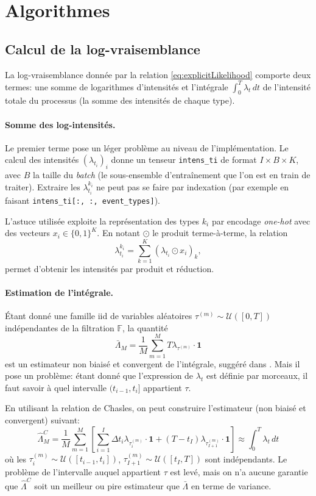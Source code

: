 \documentclass[../main.tex]{subfiles}
\begin{document}
\section{Algorithmes}\label{sec:algoAppendix}

\subsection{Calcul de la log-vraisemblance}

La log-vraisemblance donnée par la relation \eqref{eq:explicitLikelihood} comporte deux termes: une somme de logarithmes d'intensités et l'intégrale $\int_0^T\lambda_t\,dt$ de l'intensité totale du processus (la somme des intensités de chaque type).

\paragraph{Somme des log-intensités.} Le premier terme pose un léger problème au niveau de l'implémentation. Le calcul des intensités ${(\lambda_{t_i})}_i$ donne un tenseur \verb|intens_ti| de format $I\times B\times K$, avec $B$ la taille du \textit{batch} (le sous-ensemble d'entraînement que l'on est en train de traiter). Extraire les $\lambda^{k_i}_{t_i}$ ne peut pas se faire par indexation (par exemple en faisant \verb|intens_ti[:, :, event_types]|).

L'astuce utilisée exploite la représentation des types $k_i$ par encodage \textit{one-hot} avec des vecteurs $x_i\in{\{0,1\}}^K$. En notant $\odot$ le produit terme-à-terme, la relation
\[
\lambda^{k_i}_{t_i} = \sum_{k=1}^K {(\lambda_{t_i} \odot x_i)}_k,
\]
permet d'obtenir les intensités par produit et réduction.

\paragraph{Estimation de l'intégrale.} Étant donné une famille iid de variables aléatoires $\tau^{(m)}\sim\mathcal{U}([0,T])$ indépendantes de la filtration $\mathds{F}$, la quantité 
\[
\bar{\Lambda}_M = \frac{1}{M}\sum_{m=1}^{M}T\lambda_{\tau^{(m)}}\cdot\mathbf 1
\]
est un estimateur non biaisé et convergent de l'intégrale, suggéré dans \cite[16]{meiEisnerNeuralHawkes}. Mais il pose un problème: étant donné que l'expression de $\lambda_t$ est définie par morceaux, il faut savoir à quel intervalle $(t_{i-1}, t_i]$ appartient $\tau$.

En utilisant la relation de Chasles, on peut construire l'estimateur (non biaisé et convergent) suivant:
\begin{equation}
\hat{\Lambda}_M^C = \frac{1}{M}\sum_{m=1}^{M}\left[ \sum_{i=1}^{I} \Delta t_i\lambda_{\tau^{(m)}_i} \cdot \mathbf{1} + (T-t_{I})\lambda_{\tau^{(m)}_{I+1}}\cdot\mathbf{1}\right]
\approx
\int_0^T \lambda_t\,dt
\end{equation}
où les $\tau_i^{(m)}\sim\mathcal{U}([t_{i-1}, t_i])$, $\tau_{I+1}^{(m)}\sim\mathcal{U}([t_I, T])$ sont indépendants. Le problème de l'intervalle auquel appartient $\tau$ est levé, mais on n'a aucune garantie que $\hat{\Lambda}^C$ soit un meilleur ou pire estimateur que $\bar{\Lambda}$ en terme de variance.
\end{document}
